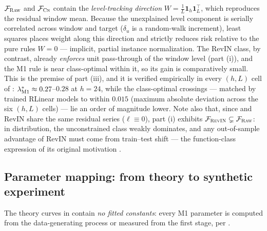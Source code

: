 \begin{remark}\label{rem:app-gain}
$\mathcal{F}_{\textsc{Raw}}$ and $\mathcal{F}_{\textsc{Cn}}$ contain the \emph{level-tracking direction} $W = \tfrac1L \mathbf 1_h \mathbf 1_L^\top$, which reproduces the residual window mean. Because the unexplained level component is serially correlated across window and target ($\delta_u$ is a random-walk increment), least squares places weight along this direction and strictly reduces risk relative to the pure rules $W = 0$ --- implicit, partial instance normalization. The RevIN class, by contrast, already \emph{enforces} unit pass-through of the window level (part (i)), and the M1 rule is near class-optimal within it, so its gain is comparatively small. This is the premise of part (iii), and it is verified empirically in every $(h,L)$ cell of : $\lambda^{*}_{\mathrm{M1}} \approx 0.27$--$0.28$ at $h=24$, while the class-optimal crossings --- matched by trained RLinear models \citep{li2023rlinear} to within $0.015$ (maximum absolute deviation across the six $(h,L)$ cells) --- lie an order of magnitude lower. Note also that, since \rawm{} and RevIN share the same residual series ($\ell \equiv 0$), part (i) exhibits $\mathcal{F}_{\textsc{RevIN}} \subsetneq \mathcal{F}_{\textsc{Raw}}$: in distribution, the unconstrained class weakly dominates, and any out-of-sample advantage of RevIN must come from train--test shift --- the function-class expression of its original motivation \citep{kim2022revin}.
\end{remark}

\subsection{Parameter mapping: from theory to synthetic experiment}\label{app:proofs:mapping}

The theory curves in  contain \emph{no fitted constants}: every M1 parameter is computed from the data-generating process or measured from the first stage, per .

